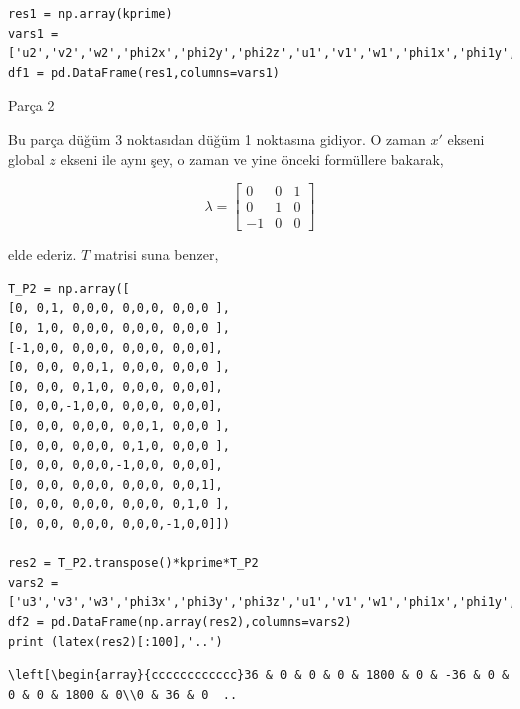 \documentclass[12pt,fleqn]{article}\usepackage{../../common}
\begin{document}
\begin{verbatim}
res1 = np.array(kprime)
vars1 = ['u2','v2','w2','phi2x','phi2y','phi2z','u1','v1','w1','phi1x','phi1y','phi1z']
df1 = pd.DataFrame(res1,columns=vars1)
\end{verbatim}

Parça 2

Bu parça düğüm 3 noktasıdan düğüm 1 noktasına gidiyor. O zaman $x'$ ekseni
global $z$ ekseni ile aynı şey, o zaman ve yine önceki formüllere bakarak,

$$
\lambda = \left[\begin{array}{ccc}
0 & 0 & 1 \\ 0 & 1 & 0 \\ -1 & 0 & 0
\end{array}\right]
$$

elde ederiz. $T$ matrisi suna benzer,

\begin{verbatim}
T_P2 = np.array([
[0, 0,1, 0,0,0, 0,0,0, 0,0,0 ],
[0, 1,0, 0,0,0, 0,0,0, 0,0,0 ],
[-1,0,0, 0,0,0, 0,0,0, 0,0,0],
[0, 0,0, 0,0,1, 0,0,0, 0,0,0 ],
[0, 0,0, 0,1,0, 0,0,0, 0,0,0],
[0, 0,0,-1,0,0, 0,0,0, 0,0,0],
[0, 0,0, 0,0,0, 0,0,1, 0,0,0 ],
[0, 0,0, 0,0,0, 0,1,0, 0,0,0 ],
[0, 0,0, 0,0,0,-1,0,0, 0,0,0],
[0, 0,0, 0,0,0, 0,0,0, 0,0,1],
[0, 0,0, 0,0,0, 0,0,0, 0,1,0 ],
[0, 0,0, 0,0,0, 0,0,0,-1,0,0]])

res2 = T_P2.transpose()*kprime*T_P2
vars2 = ['u3','v3','w3','phi3x','phi3y','phi3z','u1','v1','w1','phi1x','phi1y','phi1z']
df2 = pd.DataFrame(np.array(res2),columns=vars2)
print (latex(res2)[:100],'..')
\end{verbatim}

\begin{verbatim}
\left[\begin{array}{cccccccccccc}36 & 0 & 0 & 0 & 1800 & 0 & -36 & 0 & 0 & 0 & 1800 & 0\\0 & 36 & 0  ..
\end{verbatim}
\end{document}
